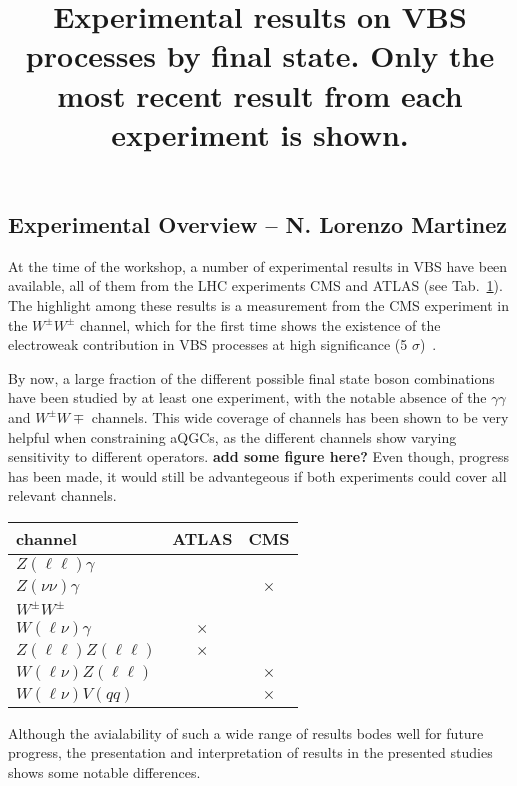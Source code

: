 \label{WG2}

\subsection{Experimental Overview -- N. Lorenzo Martinez}
At the time of the workshop, a number of experimental results in VBS have been available, all of them from the LHC experiments CMS and ATLAS (see Tab.~\ref{tab:wg2:expres}). The highlight among these results is a measurement from the CMS experiment in the $W^\pm W^\pm$ channel, which for the first time shows the existence of the electroweak contribution in VBS processes at high significance (5 $\sigma$)~\cite{CMS:2017adb}.

By now, a large fraction of the different possible final state boson combinations have been studied by at least one experiment, with the notable absence of the $\gamma\gamma$ and $W^\pm W\mp$ channels. This wide coverage of channels has been shown to be very helpful when constraining aQGCs, as the different channels show varying sensitivity to different operators.
\textbf{add some figure here?} Even though, progress has been made, it would still be advantegeous if both experiments could cover all relevant channels.

\begin{table}[htb]
\centering
\label{tab:wg2:expres}
\title{Experimental results on VBS processes by final state. Only the most recent result from each experiment is shown.}
\begin{tabular}{|l|c|c|}
    \hline
    channel & ATLAS & CMS \\
    \hline
    $Z(\ell\ell)\gamma$ & \cite{Aaboud:2017pds} & \cite{Khachatryan:2017jub} \\
    $Z(\nu\nu)\gamma$ &  \cite{Aaboud:2017pds}& $\times$ \\
    $W^\pm W^\pm$ & \cite{Aaboud:2016ffv} & \cite{CMS:2017adb} \\
    $W(\ell\nu)\gamma$ & $\times$ & \cite{Khachatryan:2016vif} \\
    $Z(\ell\ell)Z(\ell\ell)$&  $\times$  & \cite{CMS-PAS-SMP-17-006} \\
    $W(\ell\nu)Z(\ell\ell)$ & \cite{Aad:2016ett} & $\times$ \\
    $W(\ell\nu)V(qq)$ & \cite{Aaboud:2016uuk} & $\times$ \\
    \hline
  \end{tabular}  
\end{table}

Although the avialability of such a wide range of results bodes well for future progress, the presentation and interpretation of results in the presented studies shows some notable differences.

